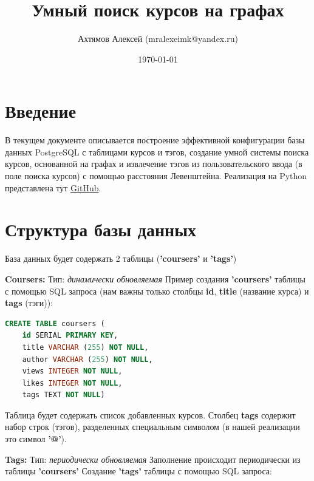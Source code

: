 \documentclass[12pt]{article}
\title{Умный поиск курсов на графах}
\author{Ахтямов Алексей (mralexeimk@yandex.ru)}
\date{\today}
\begin{document}
\maketitle

\section*{Введение}
В текущем документе описывается построение эффективной конфигурации базы данных PostgreSQL с таблицами курсов и тэгов, создание умной системы поиска курсов, основанной на графах и извлечение тэгов из пользовательского ввода (в поле поиска курсов) с помощью расстояния Левенштейна. \newline
Реализация на Python представлена тут \href{https://github.com/Yedom/RecomendationSystem}{\color{blue}GitHub}.
\section*{Структура базы данных}
База данных будет содержать 2 таблицы (\textbf{'coursers'} и \textbf{'tags'}) \newline

\noindent \textbf{Coursers:} \newline
Тип: \textit{динамически обновляемая} \newline
Пример создания \textbf{'coursers'} таблицы с помощью SQL запроса (нам важны только столбцы \textbf{id}, \textbf{title} (название курса) и \textbf{tags} (тэги)): \newline

\begin{lstlisting}[language=sql]
CREATE TABLE coursers (
	id SERIAL PRIMARY KEY,
	title VARCHAR (255) NOT NULL,
	author VARCHAR (255) NOT NULL,
	views INTEGER NOT NULL,
	likes INTEGER NOT NULL,
	tags TEXT NOT NULL)
\end{lstlisting}

\noindent Таблица будет содержать список добавленных курсов. \newline
Столбец \textbf{tags} содержит набор строк (тэгов), разделенных специальным символом (в нашей реализации это символ \textbf{'@'}). \newline

\noindent \textbf{Tags:} \newline
Тип: \textit{периодически обновляемая} \newline
Заполнение происходит периодически из таблицы \textbf{'coursers'} \newline
Создание \textbf{'tags'} таблицы с помощью SQL запроса: \newline
\end{document}
